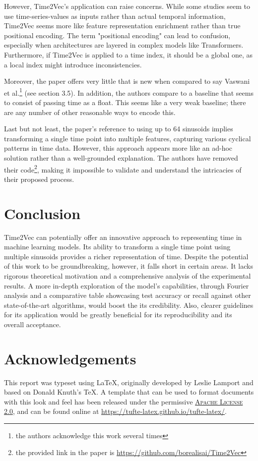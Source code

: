 \documentclass{tufte-handout}
\begin{document}
However, Time2Vec's application can raise concerns. While some studies\cite{word2vec} seem to use time-series-values as inputs rather than actual temporal information, Time2Vec seems more like feature representation enrichment rather than true positional encoding. The term "positional encoding" can lead to confusion, especially when architectures are layered in complex models like Transformers. Furthermore, if Time2Vec is applied to a time index, it should be a global one, as a local index might introduce inconsistencies.

Moreover, the paper offers very little that is new when compared to say Vaswani et al.\cite{attention}\footnote{the authors acknowledge this work several times} (see section 3.5). In addition, the authors compare to a baseline that seems to consist of passing time as a float. This seems like a very weak baseline; there are any number of other reasonable ways to encode this.

Last but not least, the paper's reference to using up to 64 sinusoids implies transforming a single time point into multiple features, capturing various cyclical patterns in time data. However, this approach appears more like an ad-hoc solution rather than a well-grounded explanation. The authors have removed their code\footnote{the provided link in the paper is \url{https://github.com/borealisai/Time2Vec}}, making it impossible to validate and understand the intricacies of their proposed process.

\section{Conclusion}

Time2Vec can potentially offer an innovative approach to representing time in machine learning models. Its ability to transform a single time point using multiple sinusoids provides a richer representation of time. Despite the potential of this work to be groundbreaking, however, it falls short in certain areas. It lacks rigorous theoretical motivation and a comprehensive analysis of the experimental results. A more in-depth exploration of the model's capabilities, through Fourier analysis and a comparative table showcasing test accuracy or recall against other state-of-the-art algorithms, would boost the its credibility. Also, clearer guidelines for its application would be greatly beneficial for its reproducibility and its overall acceptance.

\section{Acknowledgements}\label{sec:support}

This report was typeset using \LaTeX, originally developed by Leslie Lamport and based on Donald Knuth's \TeX. A template that can be used to format documents with this look and feel has been released under the permissive \href{http://www.apache.org/licenses/LICENSE-2.0}{\textsc{Apache License 2.0}}, and can be found online at \url{https://tufte-latex.github.io/tufte-latex/}.



\end{document}
